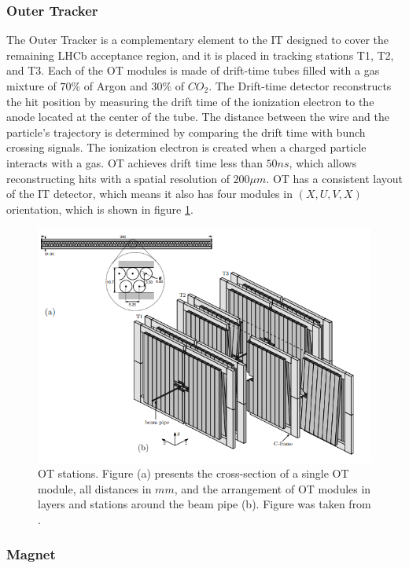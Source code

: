 \subsubsection{Outer Tracker}

 The Outer Tracker \cite{OT} is a complementary element to the IT designed to cover the remaining LHCb acceptance region, and it is placed in tracking stations T1, T2, and T3.  Each of the OT modules is made of drift-time tubes filled with a gas mixture of $70\%$ of Argon and $30\%$ of $CO_2$. 
The Drift-time detector reconstructs the hit position by measuring the drift time of the ionization electron to the anode located at the center of the tube. The distance between the wire and the particle's trajectory is determined by comparing the drift time with bunch crossing signals.  The ionization electron is created when a charged particle interacts with a gas. 
OT achieves drift time less than $50 ns$, which allows reconstructing hits with a spatial resolution of $200 \mu m$.   
OT has a consistent layout of the IT detector, which means it also has four modules in  $(X, U, V, X)$ orientation, which is shown in figure \ref{fig:OT}. 


\begin{figure}[h]
\centering
\includegraphics[scale=0.8]{figures/OT.PNG}
\caption{OT stations. Figure (a) presents the cross-section of a single OT module, all distances in $mm$, and the arrangement of OT modules in layers and stations around the beam pipe (b).  Figure was taken from \cite{lhcb}.
\label{fig:OT}}
\end{figure}

\subsubsection{Magnet}

